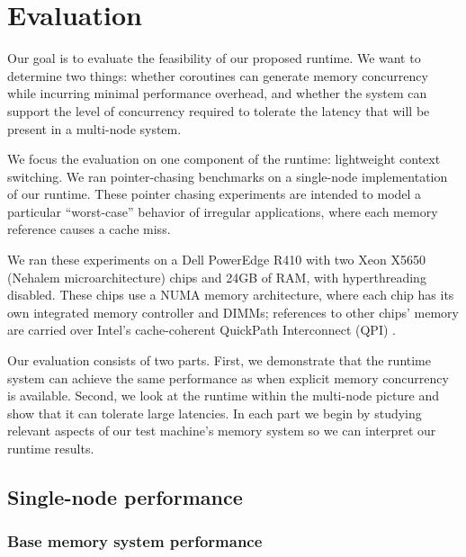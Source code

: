 \documentclass[10pt,nocopyrightspace,preprint]{sigplanconf}
\begin{document}

\section{Evaluation}
\label{sec:evaluation}

Our goal is to evaluate the feasibility of our proposed runtime. We
want to determine two things: whether coroutines can generate memory
concurrency while incurring minimal performance overhead, and whether the system can support the level of concurrency required to tolerate the latency that will be present in a multi-node system.

We focus the evaluation on one component of the runtime: lightweight context switching. We ran pointer-chasing benchmarks on a single-node implementation of our runtime. These pointer chasing experiments are intended to model a particular ``worst-case'' behavior of irregular applications, where each memory reference causes a cache miss.

We ran these experiments on a Dell PowerEdge R410 with two Xeon X5650 (Nehalem microarchitecture)
chips and 24GB of RAM, with hyperthreading disabled. These
chips use a NUMA memory architecture, where each chip has
its own integrated memory controller and DIMMs; references to other
chips' memory are carried over Intel's cache-coherent QuickPath
Interconnect (QPI) \cite{quickpath:website}.

Our evaluation consists of two parts. First, we demonstrate that the
runtime system can achieve the same performance as when 
explicit memory concurrency is available. Second, we look at the runtime
within the multi-node picture and show that it can tolerate large
latencies. In each part we begin by studying relevant aspects of our
test machine's memory system so we can interpret our runtime results.


\subsection{Single-node performance}


\subsubsection{Base memory system performance}
\label{subsubsec:evalsinglebase}
\end{document}
